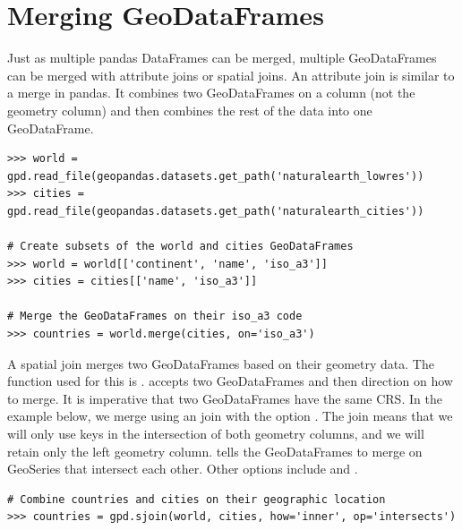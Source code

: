 \section*{Merging GeoDataFrames} %

Just as multiple pandas DataFrames can be merged, multiple GeoDataFrames can be merged with attribute joins or spatial joins.
An attribute join is similar to a merge in pandas.
It combines two GeoDataFrames on a column (not the geometry column) and then combines the rest of the data into one GeoDataFrame.

\begin{lstlisting}
>>> world = gpd.read_file(geopandas.datasets.get_path('naturalearth_lowres'))
>>> cities = gpd.read_file(geopandas.datasets.get_path('naturalearth_cities'))

# Create subsets of the world and cities GeoDataFrames
>>> world = world[['continent', 'name', 'iso_a3']]
>>> cities = cities[['name', 'iso_a3']]

# Merge the GeoDataFrames on their iso_a3 code
>>> countries = world.merge(cities, on='iso_a3')
\end{lstlisting}

A spatial join merges two GeoDataFrames based on their geometry data.
The function used for this is .
 accepts two GeoDataFrames and then direction on how to merge.
It is imperative that two GeoDataFrames have the same CRS.
In the example below, we merge using an  join with the option .
The  join means that we will only use keys in the intersection of both geometry columns, and we will retain only the left geometry column.
 tells the GeoDataFrames to merge on GeoSeries that intersect each other.
Other options include  and .

\begin{lstlisting}
# Combine countries and cities on their geographic location
>>> countries = gpd.sjoin(world, cities, how='inner', op='intersects')
\end{lstlisting}

